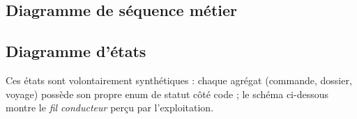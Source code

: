 \subsection{Diagramme de séquence métier}


\subsection{Diagramme d'états}

Ces états sont volontairement synthétiques : chaque agrégat (commande, dossier, voyage) possède son propre enum de statut côté code ; le schéma ci-dessous montre le \emph{fil conducteur} perçu par l'exploitation.

